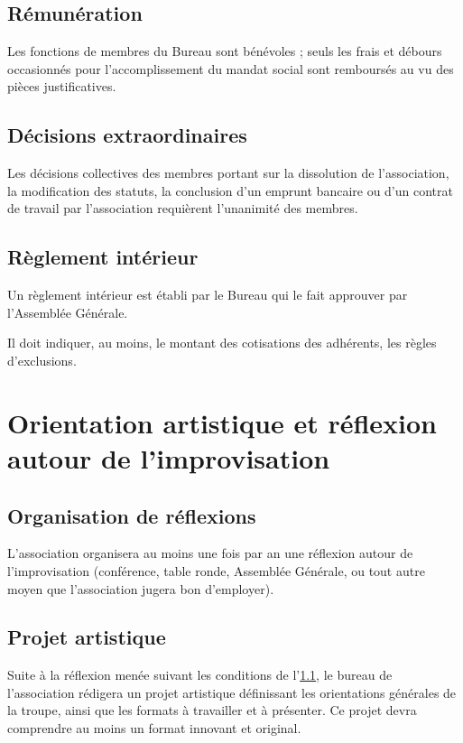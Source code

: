 \documentclass[a4paper,french,10pt]{article}
\begin{document}
\subsection{Rémunération}
\label{sec:remuneration}
Les fonctions de membres du Bureau sont bénévoles ; seuls les frais et
débours occasionnés pour l’accomplissement du mandat social sont
remboursés au vu des pièces justificatives.

\subsection{Décisions extraordinaires}
\label{sec:decisions}
Les décisions collectives des membres portant sur la dissolution de
l’association, la modification des statuts, la conclusion d’un emprunt
bancaire ou d’un contrat de travail par l’association requièrent
l’unanimité des membres.

\subsection{Règlement intérieur}
\label{sec:reglement}
Un règlement intérieur est établi par le Bureau qui le fait approuver
par l’Assemblée Générale.

Il doit indiquer, au moins, le montant des cotisations des adhérents, les règles d'exclusions.


\section{Orientation artistique et réflexion autour de
  l'improvisation}

\subsection{Organisation de réflexions}
\label{sec:reflexions}
L'association organisera au moins une fois par an une réflexion autour
de l'improvisation (conférence, table ronde, Assemblée Générale, ou
tout autre moyen que l'association jugera bon d'employer).


\subsection{Projet artistique}
\label{sec:projet}
Suite à la réflexion menée suivant les conditions de l'\ref{sec:reflexions}, le
bureau de l'association rédigera un projet artistique définissant les
orientations générales de la troupe, ainsi que les formats à
travailler et à présenter. Ce projet devra comprendre au moins un
format innovant et original.
\end{document}
